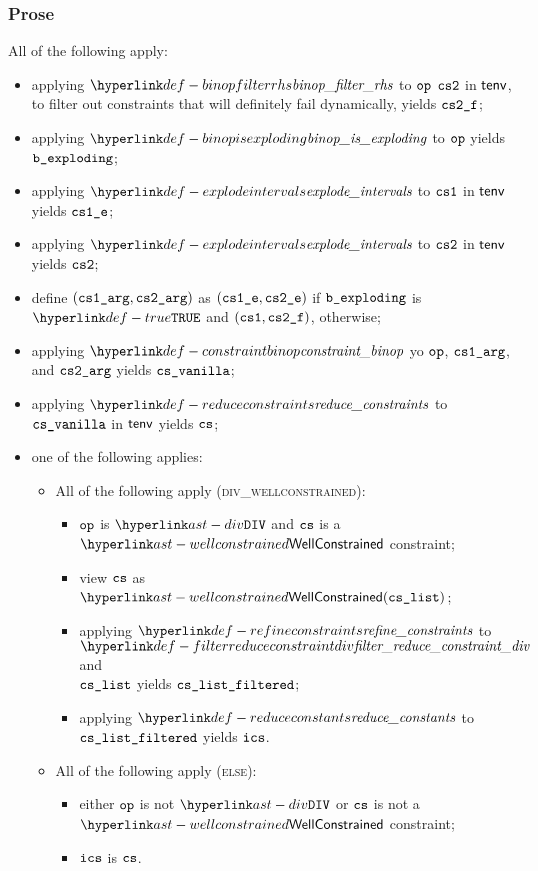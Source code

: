 \subsubsection{Prose}
All of the following apply:
\begin{itemize}
  \item applying $\binopfilterrhs$ to $\texttt{op}$ $\texttt{cs2}$ in $\textsf{tenv}$, to filter out constraints that will definitely fail dynamically, yields $\texttt{cs2\_f}$;
  \item applying $\binopisexploding$ to $\texttt{op}$ yields $\texttt{b\_exploding}$;
  \item applying $\explodeintervals$ to $\texttt{cs1}$ in $\textsf{tenv}$ yields $\texttt{cs1\_e}$;
  \item applying $\explodeintervals$ to $\texttt{cs2}$ in $\textsf{tenv}$ yields $\texttt{cs2}$;
  \item define $(\texttt{cs1\_arg}, \texttt{cs2\_arg})$ as $(\texttt{cs1\_e}, \texttt{cs2\_e})$ if $\texttt{b\_exploding}$ is $\True$ and $(\texttt{cs1}, \texttt{cs2\_f})$, otherwise;
  \item applying $\constraintbinop$ yo $\texttt{op}$, $\texttt{cs1\_arg}$, and $\texttt{cs2\_arg}$ yields $\texttt{cs\_vanilla}$;
  \item applying $\reduceconstraints$ to $\texttt{cs\_vanilla}$ in $\textsf{tenv}$ yields $\texttt{cs}$;
  \item one of the following applies:
  \begin{itemize}
    \item All of the following apply (\textsc{div\_wellconstrained}):
    \begin{itemize}
      \item $\texttt{op}$ is $\DIV$ and $\texttt{cs}$ is a $\wellconstrained$ constraint;
      \item view $\texttt{cs}$ as $\wellconstrained(\cslist)$;
      \item applying $\refineconstraints$ to $\filterreduceconstraintdiv$ and \\
            $\texttt{cs\_list}$ yields $\texttt{cs\_list\_filtered}$;
      \item applying $\reduceconstants$ to $\texttt{cs\_list\_filtered}$ yields $\texttt{ics}$.
    \end{itemize}

    \item All of the following apply (\textsc{else}):
    \begin{itemize}
      \item either $\texttt{op}$ is not $\DIV$ or $\texttt{cs}$ is not a $\wellconstrained$ constraint;
      \item $\texttt{ics}$ is $\texttt{cs}$.
    \end{itemize}
  \end{itemize}
\end{itemize}


